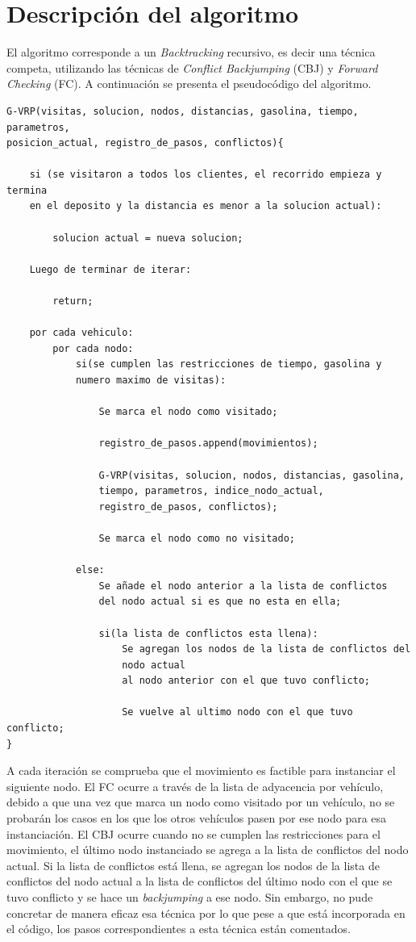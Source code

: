 \documentclass[letter, 10pt]{article}
\begin{document}
\section{Descripción del algoritmo}
El algoritmo corresponde a un \textit{Backtracking} recursivo, es decir una técnica competa, utilizando las técnicas de \textit{Conflict Backjumping} (CBJ) y \textit{Forward Checking} (FC). 
A continuación se presenta el pseudocódigo del algoritmo.
\begin{lstlisting}
G-VRP(visitas, solucion, nodos, distancias, gasolina, tiempo, parametros, 
posicion_actual, registro_de_pasos, conflictos){

    si (se visitaron a todos los clientes, el recorrido empieza y termina 
    en el deposito y la distancia es menor a la solucion actual):
    
        solucion actual = nueva solucion;
        
    Luego de terminar de iterar:
    
        return;
        
    por cada vehiculo:
        por cada nodo:
            si(se cumplen las restricciones de tiempo, gasolina y 
            numero maximo de visitas):
            
                Se marca el nodo como visitado;
                
                registro_de_pasos.append(movimientos);
                
                G-VRP(visitas, solucion, nodos, distancias, gasolina, 
                tiempo, parametros, indice_nodo_actual, 
                registro_de_pasos, conflictos);
                
                Se marca el nodo como no visitado;
                
            else:
                Se añade el nodo anterior a la lista de conflictos 
                del nodo actual si es que no esta en ella;
                
                si(la lista de conflictos esta llena):
                    Se agregan los nodos de la lista de conflictos del 
                    nodo actual
                    al nodo anterior con el que tuvo conflicto;
                    
                    Se vuelve al ultimo nodo con el que tuvo conflicto; 
}
\end{lstlisting}
A cada iteración se comprueba que el movimiento es factible para instanciar el siguiente nodo.
El FC ocurre a través de la lista de adyacencia por vehículo, debido a que una vez que marca un nodo como visitado por un vehículo, no se probarán los casos en los que los otros vehículos pasen por ese nodo para esa instanciación.
El CBJ ocurre cuando no se cumplen las restricciones para el movimiento, el último nodo instanciado se agrega a la lista de conflictos del nodo actual. Si la lista de conflictos está llena, se agregan los nodos de la lista de conflictos del nodo actual a la lista de conflictos del último nodo con el que se tuvo conflicto y se hace un \textit{backjumping} a ese nodo. Sin embargo, no pude concretar de manera eficaz esa técnica por lo que pese a que está incorporada en el código, los pasos correspondientes a esta técnica están comentados.
\end{document}
